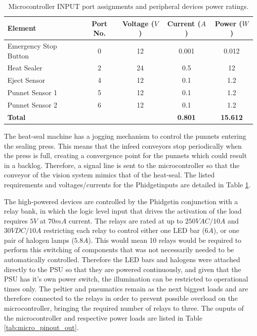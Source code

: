 \documentclass[fleqn,twoside,12pt]{report}
\begin{document}
\renewcommand{\arraystretch}{0.8}%
\begin{table}[h]
	\centering
	\caption{Microcontroller INPUT port assignments and peripheral devices power ratings.}
	\label{tab:micro_pinout_in}
	\begin{tabular}{lcccc}
		
		\toprule
		\textbf{Element}  & \textbf{Port No.} & \textbf{Voltage ($V$)} & \textbf{Current ($A$)} & \textbf{Power ($W$)}\\[8pt]
		\midrule
		Emergency Stop Button 	& 0 & 12 & 0.001 & 0.012  \\[4pt]
		\midrule
		Heat Sealer 			& 2 & 24 & 0.5 & 12 \\[4pt]
		\midrule
		Eject Sensor 			& 4 & 12 & 0.1 & 1.2  \\[4pt]
		\midrule
		Punnet Sensor 1 		& 5 & 12 & 0.1 & 1.2 \\[4pt]
		\midrule
		Punnet Sensor 2 		& 6 & 12 & 0.1 & 1.2  \\[4pt]
		\midrule
		\textbf{Total} 			&   &    & \textbf{0.801} & \textbf{15.612} \\[4pt]
		\bottomrule
		
	\end{tabular}
\end{table}


The heat-seal machine has a jogging mechanism to control the punnets entering the sealing press. This means that the infeed conveyors stop periodically when the press is full, creating a convergence point for the punnets which could result in a backlog. Therefore, a signal line is sent to the microcontroller so that the conveyor of the vision system mimics that of the heat-seal. The listed requirements and voltages/currents for the Phidget\texttrademark inputs are detailed in Table \ref{tab:micro_pinout_in}.

The high-powered devices are controlled by the Phidget\texttrademark in conjunction with a relay bank, in which the logic level input that drives the activation of the load requires $5V$ at $70mA$ current. The relays are rated at up to $250VAC/10A$ and $30VDC/10A$ restricting each relay to control either one LED bar ($6A$), or one pair of halogen lamps ($5.8A$). This would mean 10 relays would be required to perform this switching of components that was not necessarily needed to be automatically controlled. Therefore the LED bars and halogens were attached directly to the PSU so that they are powered continuously, and given that the PSU has it's own power switch, the illumination can be restricted to operational times only. The peltier and pneumatics remain as the next biggest loads and are therefore connected to the relays in order to prevent possible overload on the microcontroller, bringing the required number of relays to three. The ouputs of the microcontroller and respective power loads are listed in Table \ref{tab:micro_pinout_out}.
\end{document}
